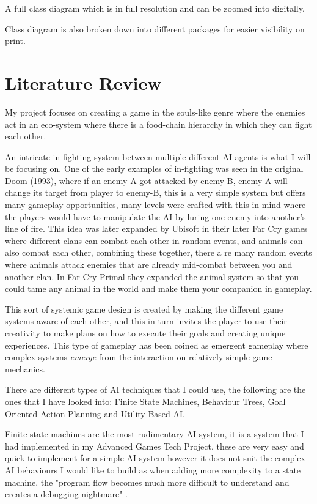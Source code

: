 \documentclass[11pt]{report}
\begin{document}
A full class diagram which is in full resolution and can be zoomed into digitally.

Class diagram is also broken down into different packages for easier visibility on print.

\chapter{Literature Review}
My project focuses on creating a game in the souls-like genre where the enemies act in an eco-system where there is a food-chain hierarchy in which they can fight each other.

An intricate in-fighting system between multiple different AI agents is what I will be focusing on. One of the early examples of in-fighting was seen in the original Doom (1993)\cite{doom93}, where if an enemy-A got attacked by enemy-B, enemy-A will change its target from player to enemy-B, this is a very simple system but offers many gameplay opportunities, many levels were crafted with this in mind where the players would have to manipulate the AI by luring one enemy into another's line of fire.
This idea was later expanded by Ubisoft in their later Far Cry games where different clans can combat each other in random events, and animals can also combat each other, combining these together, there a re many random events where animals attack enemies that are already mid-combat between you and another clan. In Far Cry Primal they expanded the animal system so that you could tame any animal in the world and make them your companion in gameplay.

This sort of systemic game design is created by making the different game systems aware of each other, and this in-turn invites the player to use their creativity to make plans on how to execute their goals and creating unique experiences. This type of gameplay has been coined as emergent gameplay where complex systems \textit{emerge} from the interaction on relatively simple game mechanics.\cite{emergentGameplay}

There are different types of AI techniques that I could use, the following are the ones that I have looked into: Finite State Machines, Behaviour Trees, Goal Oriented Action Planning and Utility Based AI.

Finite state machines are the most rudimentary AI system, it is a system that I had implemented in my Advanced Games Tech Project, these are very easy and quick to implement for a simple AI system however it does not suit the complex AI behaviours I would like to build as when adding more complexity to a state machine, the "program flow becomes much more difficult to understand and creates a debugging nightmare" \cite{gameAiByExample}.
\end{document}
